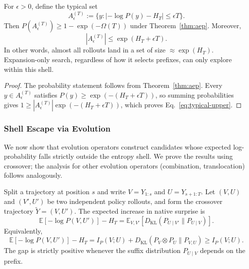 \documentclass{llmxive}
\begin{document}
\begin{corollary}
\label{cor:shell}
For $\epsilon>0$, define the typical set
\begin{equation}
  A_\epsilon^{(T)}:=\{y:|-\log P(y)-H_T|\le\epsilon T\}.
\end{equation}
Then $P(A_\epsilon^{(T)})\ge1-\exp(-\Omega(T))$ under Theorem~\ref{thm:aep}. Moreover,
\begin{equation}
  |A_\epsilon^{(T)}|\le\exp(H_T+\epsilon T).
  \label{eq:typical-upper}
\end{equation}
In other words, almost all rollouts land in a set of size $\approx \exp(H_T)$. Expansion-only search, regardless of how it selects prefixes, can only explore within this shell.
\end{corollary}

\begin{proof}
The probability statement follows from Theorem~\ref{thm:aep}. Every $y\in A_\epsilon^{(T)}$ satisfies $P(y)\ge\exp(-(H_T+\epsilon T))$, so summing probabilities gives $1\ge |A_\epsilon^{(T)}|\exp(-(H_T+\epsilon T))$, which proves Eq.~\eqref{eq:typical-upper}.
\end{proof}

\subsubsection{Shell Escape via Evolution}

We now show that evolution operators construct candidates whose expected log-probability falls strictly outside the entropy shell. We prove the results using crossover; the analysis for other evolution operators (combination, translocation) follows analogously.

\begin{lemma}
\label{lem:splice}
Split a trajectory at position $s$ and write $V=Y_{1:s}$ and $U=Y_{s+1:T}$. Let $(V,U)$ and $(V',U')$ be two independent policy rollouts, and form the crossover trajectory $\widetilde{Y}=(V,U')$. The expected increase in native surprise is
\begin{equation}
  \mathbb{E}[-\log P(V,U')]-H_T
  =\mathbb{E}_{V,V'}
  \left[D_{\mathrm{KL}}(P_{U\mid V'}\|P_{U\mid V})\right].
  \label{eq:splice-kl}
\end{equation}
Equivalently,
\begin{equation}
  \mathbb{E}[-\log P(V,U')]-H_T
  =I_P(V;U)+D_{\mathrm{KL}}(P_V\otimes P_U\|P_{V,U})
  \ge I_P(V;U).
  \label{eq:splice-mi}
\end{equation}
The gap is strictly positive whenever the suffix distribution $P_{U\mid V}$ depends on the prefix.
\end{lemma}
\end{document}
